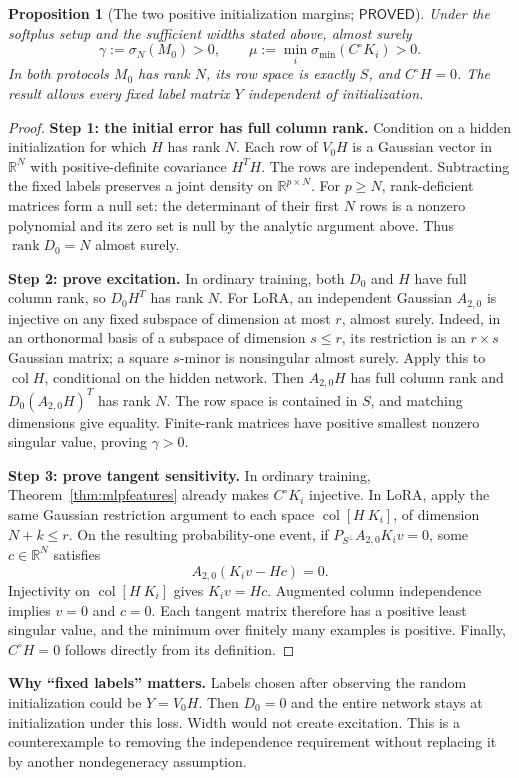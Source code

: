 \documentclass[12pt,a4paper]{article}
\theoremstyle{readable}
\newtheorem{proposition}[theorem]{Proposition}
\theoremstyle{definition}\newtheorem{example}[theorem]{Example}
\newcommand{\R}{\mathbb R}\newcommand{\rank}{\operatorname{rank}}
\newcommand{\col}{\operatorname{col}}\newcommand{\row}{\operatorname{row}}
\newcommand{\PP}{\mathsf{PROVED}}\newcommand{\FF}{\mathsf{FALSE}}
\begin{document}
\begin{proposition}[The two positive initialization margins; \(\PP\)]\label{prop:mlpmargins}
Under the softplus setup and the sufficient widths stated above, almost surely
\[
\gamma:=\sigma_N(M_0)>0,\qquad
\mu:=\min_i\sigma_{\min}(C^\circ K_i)>0.
\]
In both protocols \(M_0\) has rank \(N\), its row space is exactly \(S\), and \(C^\circ H=0\). The result allows every fixed label matrix \(Y\) independent of initialization.
\end{proposition}
\begin{proof}
\textbf{Step 1: the initial error has full column rank.} Condition on a hidden initialization for which \(H\) has rank \(N\). Each row of \(V_0H\) is a Gaussian vector in \(\R^N\) with positive-definite covariance \(H^TH\). The rows are independent. Subtracting the fixed labels preserves a joint density on \(\R^{p\times N}\). For \(p\ge N\), rank-deficient matrices form a null set: the determinant of their first \(N\) rows is a nonzero polynomial and its zero set is null by the analytic argument above. Thus \(\rank D_0=N\) almost surely.

\textbf{Step 2: prove excitation.} In ordinary training, both \(D_0\) and \(H\) have full column rank, so \(D_0H^T\) has rank \(N\). For LoRA, an independent Gaussian \(A_{2,0}\) is injective on any fixed subspace of dimension at most \(r\), almost surely. Indeed, in an orthonormal basis of a subspace of dimension \(s\le r\), its restriction is an \(r\times s\) Gaussian matrix; a square \(s\)-minor is nonsingular almost surely. Apply this to \(\col H\), conditional on the hidden network. Then \(A_{2,0}H\) has full column rank and \(D_0(A_{2,0}H)^T\) has rank \(N\). The row space is contained in \(S\), and matching dimensions give equality. Finite-rank matrices have positive smallest nonzero singular value, proving \(\gamma>0\).

\textbf{Step 3: prove tangent sensitivity.} In ordinary training, Theorem~\ref{thm:mlpfeatures} already makes \(C^\circ K_i\) injective. In LoRA, apply the same Gaussian restriction argument to each space \(\col[H\ K_i]\), of dimension \(N+k\le r\). On the resulting probability-one event, if
\(P_{S^\perp}A_{2,0}K_iv=0\), some \(c\in\R^N\) satisfies
\[
A_{2,0}(K_iv-Hc)=0.
\]
Injectivity on \(\col[H\ K_i]\) gives \(K_iv=Hc\). Augmented column independence implies \(v=0\) and \(c=0\). Each tangent matrix therefore has a positive least singular value, and the minimum over finitely many examples is positive. Finally, \(C^\circ H=0\) follows directly from its definition.
\end{proof}
\textbf{Why ``fixed labels'' matters.} Labels chosen after observing the random initialization could be \(Y=V_0H\). Then \(D_0=0\) and the entire network stays at initialization under this loss. Width would not create excitation. This is a counterexample to removing the independence requirement without replacing it by another nondegeneracy assumption.
\end{document}
